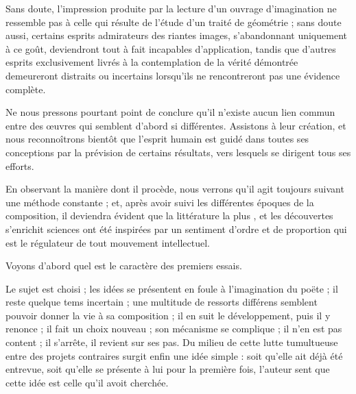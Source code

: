 \documentclass[11pt,a4paper]{article}
\begin{document}
Sans doute, l'impression produite par la lecture d'un ouvrage d'imagination ne
ressemble pas à celle qui résulte de l'étude d'un traité de géométrie ; sans
doute aussi, certains esprits admirateurs des riantes images, s'abandonnant
uniquement à ce goût, deviendront tout à fait incapables d'application, tandis
que d'autres esprits exclusivement livrés à la contemplation de la vérité
démontrée demeureront distraits ou incertains lorsqu'ils ne rencontreront pas
une évidence complète.

Ne nous pressons pourtant point de conclure qu'il n'existe aucun lien commun
entre des œuvres qui semblent d'abord si différentes. Assistons à leur création,
et nous reconnoîtrons bientôt que l'esprit humain est guidé dans toutes ses
conceptions par la prévision de certains résultats, vers lesquels se dirigent
tous ses efforts.

En observant la manière dont il procède, nous verrons qu'il agit toujours
suivant une méthode constante ; et, après avoir suivi les différentes époques de
la composition, il deviendra évident que la littérature la plus \ill{}, et les
découvertes   s'enrichit
 sciences ont été inspirées par un sentiment d'ordre et
de proportion qui est le régulateur de tout mouvement intellectuel.



Voyons d'abord quel est le caractère des premiers essais.

Le sujet est choisi ; les idées se présentent en foule à l'imagination du
poëte ; il reste quelque tems incertain ; une multitude de ressorts différens
semblent pouvoir donner la vie à sa composition ; il \struck{\ill{}} en suit le
développement, puis il y renonce ; il fait un choix nouveau ; son mécanisme se
complique ; il n'en est pas content ; il s'arrête,  il revient
sur ses pas. Du milieu de cette lutte tumultueuse entre des projets contraires
surgit enfin une idée simple : soit qu'elle ait déjà été entrevue, soit qu'elle
se présente à lui pour la première fois, l'auteur sent que cette idée est celle
qu'il avoit cherchée.
\end{document}
